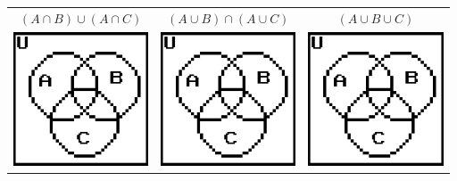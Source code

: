 \documentclass[a4paper,12pt]{book}
\newcounter{question}
\begin{document}
\begin{questionNOGRADE}{\thequestion}
\begin{center}
\begin{tabular}{c c c}
                    \\
                    $(A \cap B) \cup (A \cap C)$ &
                    $(A \cup B) \cap (A \cup C)$ &
                    $(A \cup B \cup C)$
                    \\
                    \includegraphics[width=4cm]{images/venndiagram.png} &
                    \includegraphics[width=4cm]{images/venndiagram.png} &
                    \includegraphics[width=4cm]{images/venndiagram.png}
                \end{tabular}
            \end{center}

        \end{questionNOGRADE}

        \newpage
\end{document}

